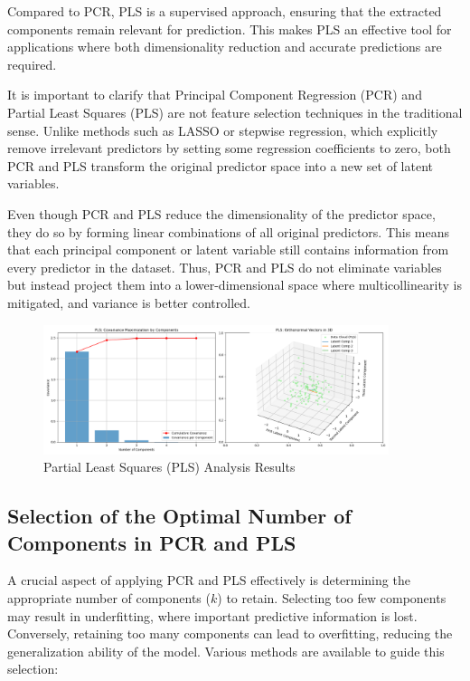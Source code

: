 \documentclass[11pt,twoside,a4paper]{article}
\begin{document}
Compared to PCR, PLS is a supervised approach, ensuring that the extracted components remain relevant for prediction. This makes PLS an effective tool for applications where both dimensionality reduction and accurate predictions are required.

It is important to clarify that Principal Component Regression (PCR) and Partial Least Squares (PLS) are not feature selection techniques in the traditional sense. Unlike methods such as LASSO or stepwise regression, which explicitly remove irrelevant predictors by setting some regression coefficients to zero, both PCR and PLS transform the original predictor space into a new set of latent variables.

Even though PCR and PLS reduce the dimensionality of the predictor space, they do so by forming linear combinations of all original predictors. This means that each principal component or latent variable still contains information from every predictor in the dataset. Thus, PCR and PLS do not eliminate variables but instead project them into a lower-dimensional space where multicollinearity is mitigated, and variance is better controlled.


\begin{figure}[H]
    \centering
    \includegraphics[width=0.9\textwidth]{PLS_Selected_Analysis.png}
    \caption{Partial Least Squares (PLS) Analysis Results}
    \label{fig:PLS_analysis}
\end{figure}



\subsection{Selection of the Optimal Number of Components in PCR and PLS}
A crucial aspect of applying PCR and PLS effectively is determining the appropriate number of components (\( k \)) to retain. Selecting too few components may result in underfitting, where important predictive information is lost. Conversely, retaining too many components can lead to overfitting, reducing the generalization ability of the model. Various methods are available to guide this selection:
\end{document}
